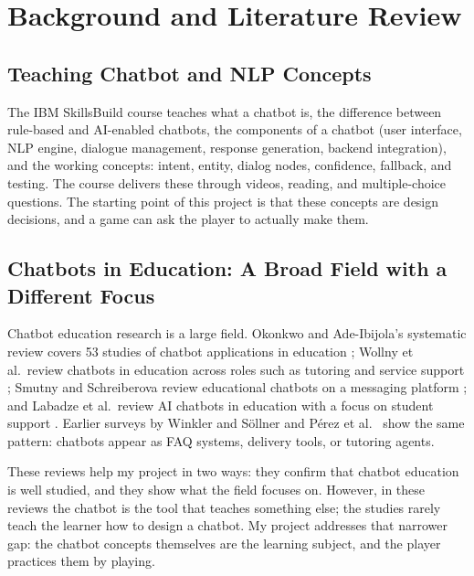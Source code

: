 \documentclass[11pt,a4paper]{article}
\begin{document}
\section{Background and Literature Review}

\subsection{Teaching Chatbot and NLP Concepts}

The IBM SkillsBuild course teaches what a chatbot is, the difference between rule-based and AI-enabled chatbots, the components of a chatbot (user interface, NLP engine, dialogue management, response generation, backend integration), and the working concepts: intent, entity, dialog nodes, confidence, fallback, and testing. The course delivers these through videos, reading, and multiple-choice questions. The starting point of this project is that these concepts are design decisions, and a game can ask the player to actually make them.

\subsection{Chatbots in Education: A Broad Field with a Different Focus}

Chatbot education research is a large field. Okonkwo and Ade-Ibijola's systematic review covers 53 studies of chatbot applications in education \cite{okonkwo2021}; Wollny et al.\ review chatbots in education across roles such as tutoring and service support \cite{wollny2021}; Smutny and Schreiberova review educational chatbots on a messaging platform \cite{smutny2020}; and Labadze et al.\ review AI chatbots in education with a focus on student support \cite{labadze2023}. Earlier surveys by Winkler and S\"{o}llner \cite{winkler2018} and P\'{e}rez et al.\ \cite{perez2020} show the same pattern: chatbots appear as FAQ systems, delivery tools, or tutoring agents.

These reviews help my project in two ways: they confirm that chatbot education is well studied, and they show what the field focuses on. However, in these reviews the chatbot is the tool that teaches something else; the studies rarely teach the learner how to design a chatbot. My project addresses that narrower gap: the chatbot concepts themselves are the learning subject, and the player practices them by playing.
\end{document}
